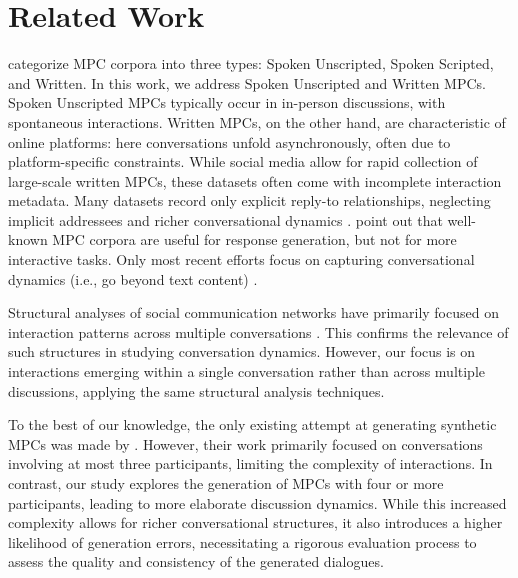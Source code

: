 \section{Related Work}
\citet{mahajan-shaikh-2021-need} categorize MPC corpora into three types: Spoken Unscripted, Spoken Scripted, and Written. In this work, we address Spoken Unscripted and Written MPCs. Spoken Unscripted MPCs typically occur in in-person discussions, with spontaneous interactions. Written MPCs, on the other hand, are characteristic of online platforms: here conversations unfold asynchronously, often due to platform-specific constraints. While social media allow for rapid collection of large-scale written MPCs, these datasets often come with incomplete interaction metadata. Many datasets record only explicit reply-to relationships, neglecting implicit addressees and richer conversational dynamics \cite{ouchi-tsuboi-2016-addressee, zhang-etal-2018-conversations, chang-danescu-niculescu-mizil-2019-trouble}. \citet{weiEtAl2023} point out that well-known MPC corpora \cite{ritter-etal-2010-unsupervised, baumgartner2020pushshiftredditdataset, lowe-etal-2015-ubuntu} are useful for response generation, but not for more interactive tasks. Only most recent efforts focus on capturing conversational dynamics (i.e., go beyond text content) \cite{hua-etal-2024-get}.

Structural analyses of social communication networks have primarily focused on interaction patterns across multiple conversations \cite{panzarasa2009patterns, coletto2017motif, 10.1145/3178876.3186139, felmlee2021dyads}. This confirms the relevance of such structures in studying conversation dynamics. However, our focus is on interactions emerging within a single conversation rather than across multiple discussions, applying the same structural analysis techniques. 

To the best of our knowledge, the only existing attempt at generating synthetic MPCs was made by \citet{chen-etal-2023-places}. However, their work primarily focused on conversations involving at most three participants, limiting the complexity of interactions. In contrast, our study explores the generation of MPCs with four or more participants, leading to more elaborate discussion dynamics. While this increased complexity allows for richer conversational structures, it also introduces a higher likelihood of generation errors, necessitating a rigorous evaluation process to assess the quality and consistency of the generated dialogues.